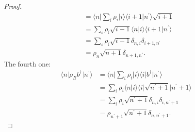 \documentclass[../../note.tex]{subfiles}
\begin{document}
\begin{proof}
\begin{align}
        &= \langle n \vert \sum_i \rho_i \vert i \rangle \langle i+1 \vert n^\prime \rangle \sqrt{i+1} \\
        &= \sum_i \rho_i \sqrt{i+1} \langle n \vert i \rangle \langle i+1 \vert n^\prime \rangle \\
        &= \sum_i \rho_i \sqrt{i+1} \delta_{n, i} \delta_{i+1, n^\prime}\\ 
        &= \rho_n \sqrt{n+1} \delta_{n+1, n^\prime}.
    \end{align}
    The fourth one:
    \begin{align}
        \langle n \vert \rho_B b^\dagger \vert n^\prime \rangle 
        &= \langle n \vert \sum_i \rho_i \vert i \rangle \langle i \vert b^\dagger \vert n^\prime \rangle \\
        &= \sum_i \rho_i \langle n \vert i \rangle \langle i \vert \sqrt{n^\prime + 1} \vert n^\prime + 1 \rangle \\
        &= \sum_i \rho_i \sqrt{n^\prime+1} \delta_{n, i} \delta_{i, n^\prime + 1} \\
        &= \rho_{n^\prime + 1} \sqrt{n^\prime + 1}\delta_{n, n^\prime + 1}.
    \end{align}
\end{proof}
\end{document}
